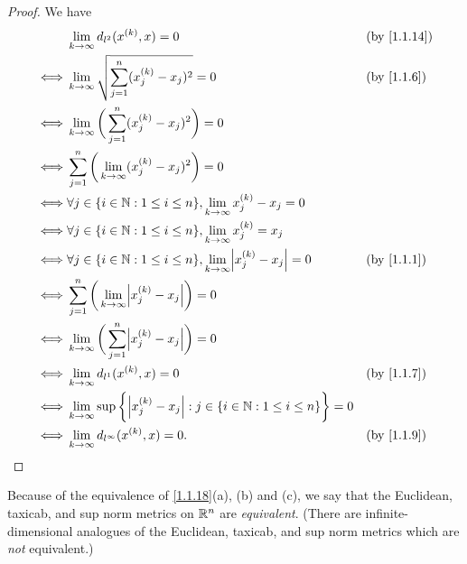 \begin{proof}
  We have
  \begin{align*}
         & \lim_{k \to \infty} d_{l^2}(x^{(k)}, x) = 0                                                            &  & \by{1.1.14} \\
    \iff & \lim_{k \to \infty} \sqrt{\sum_{j = 1}^n (x_j^{(k)} - x_j)^2} = 0                                      &  & \by{1.1.6}  \\
    \iff & \lim_{k \to \infty} \bigg(\sum_{j = 1}^n (x_j^{(k)} - x_j)^2\bigg) = 0                                                  \\
    \iff & \sum_{j = 1}^n \bigg(\lim_{k \to \infty} (x_j^{(k)} - x_j)^2\bigg) = 0                                                  \\
    \iff & \forall j \in \{i \in \N : 1 \leq i \leq n\}, \lim_{k \to \infty} x_j^{(k)} - x_j = 0                                   \\
    \iff & \forall j \in \{i \in \N : 1 \leq i \leq n\}, \lim_{k \to \infty} x_j^{(k)} = x_j                                       \\
    \iff & \forall j \in \{i \in \N : 1 \leq i \leq n\}, \lim_{k \to \infty} \abs{x_j^{(k)} - x_j} = 0            &  & \by{1.1.1}  \\
    \iff & \sum_{j = 1}^n \bigg(\lim_{k \to \infty} \abs{x_j^{(k)} - x_j}\bigg) = 0                                                \\
    \iff & \lim_{k \to \infty} \bigg(\sum_{j = 1}^n \abs{x_j^{(k)} - x_j}\bigg) = 0                                                \\
    \iff & \lim_{k \to \infty} d_{l^1}(x^{(k)}, x) = 0                                                            &  & \by{1.1.7}  \\
    \iff & \lim_{k \to \infty} \sup\bigg\{\abs{x_j^{(k)} - x_j} : j \in \{i \in \N : 1 \leq i \leq n\}\bigg\} = 0                  \\
    \iff & \lim_{k \to \infty} d_{l^\infty}(x^{(k)}, x) = 0.                                                      &  & \by{1.1.9}
  \end{align*}
\end{proof}

\begin{note}
  Because of the equivalence of \cref{1.1.18}(a), (b) and (c), we say that the Euclidean, taxicab, and sup norm metrics on \(\mathbb{R}^n\) are \emph{equivalent}.
  (There are infinite-dimensional analogues of the Euclidean, taxicab, and sup norm metrics which are \emph{not} equivalent.)
\end{note}

